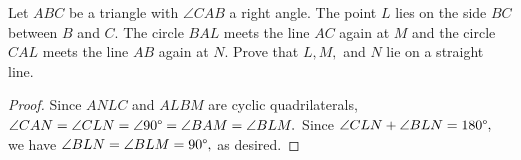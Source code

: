 \documentclass[letterpaper,oneside]{scrartcl}
\begin{document}
\begin{problem*}
  Let $ABC$ be a triangle with $\angle CAB$ a right angle. The point $L$ lies on the side $BC$ between $B$ and $C$. The circle $BAL$ meets the line $AC$ again at $M$ and the circle $CAL$ meets the line $AB$ again at $N.$ Prove that $L, M,$ and $N$ lie on a straight line.
\end{problem*}
\begin{proof}
  Since $ANLC$ and $ALBM$ are cyclic quadrilaterals, $\angle CAN = \angle CLN = \angle 90\degree = \angle BAM = \angle BLM.$ Since $\angle CLN + \angle BLN = 180\degree,$ we have $\angle BLN = \angle BLM = 90\degree,$ as desired.
\end{proof}
\end{document}
